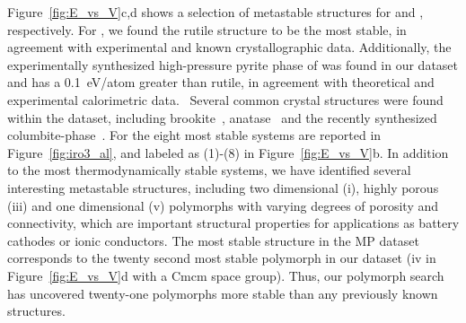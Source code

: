 Figure~\ref{fig:E_vs_V}c,d shows a selection of metastable structures for \IrOtwo and \IrOthree, respectively.
%
For \IrOtwo, we found the rutile structure to be the most stable,
in agreement with experimental and known crystallographic data.
%
Additionally, the experimentally synthesized high-pressure pyrite phase of \IrOtwo was found in our dataset and has a \DHf \mytilde\SI{0.1}{\electronvolt}/atom greater than rutile,
in agreement with theoretical and experimental calorimetric data.~\cite{bolzan1997structural, shirako2014synthesis}
%
%
Several common \ABtwo crystal structures were found within the dataset,
including brookite~\cite{brookite}, anatase~\cite{anatase} and the recently synthesized columbite-\IrOtwo phase~\cite{Lee2020}.
%
For \IrOthree the eight most stable systems are reported in Figure~\ref{fig:iro3_al}, and labeled as (1)-(8) in Figure~\ref{fig:E_vs_V}b.
%
In addition to the most thermodynamically stable systems,
we have identified several interesting metastable structures,
including two dimensional (i), highly porous (iii) and one dimensional (v) polymorphs with varying degrees of porosity and connectivity,
which are important structural properties for applications as battery cathodes or ionic conductors.\cite{Pearce2017,Pearce2019}
%
%
The most stable \IrOthree structure in the MP dataset~\cite{mp-1097041} corresponds to the twenty second most stable \IrOthree polymorph in our dataset
(iv in Figure~\ref{fig:E_vs_V}d with a Cmcm space group).
%
Thus, our polymorph search has uncovered twenty-one \IrOthree polymorphs more stable than any previously known structures.
